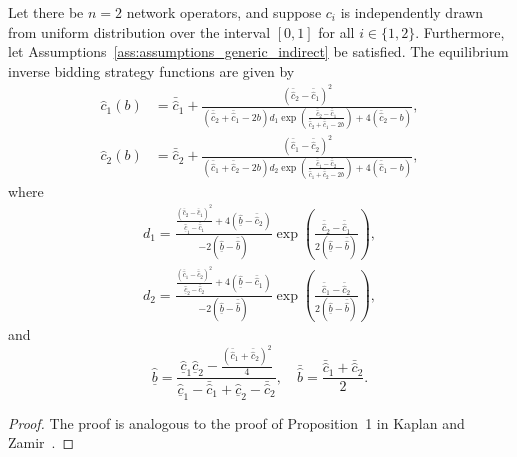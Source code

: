 \begin{propositiona}[\ref{prop:equilibrium_restricted_indirect}]
Let there be $n=2$ network operators, and suppose $c_i$ is independently drawn from uniform distribution over the interval $[0,1]$ for all $i\in \{1, 2\}$. Furthermore, let Assumptions~\ref{ass:assumptions_generic_indirect} be satisfied. The equilibrium inverse bidding strategy functions are given by
\begin{align}
  \hat{c}_1(b) &= \bar{\hat{c}}_1 + \frac{(\bar{\hat{c}}_2 - \bar{\hat{c}}_1)^2}{(\bar{\hat{c}}_2 + \bar{\hat{c}}_1 - 2b)d_1 \exp{\left(\displaystyle\frac{\bar{\hat{c}}_2 - \bar{\hat{c}}_1}{\bar{\hat{c}}_2 + \bar{\hat{c}}_1 - 2b}\right)} + 4(\bar{\hat{c}}_2 - b)},\\[2ex]
  \hat{c}_2(b) &= \bar{\hat{c}}_2 + \frac{(\bar{\hat{c}}_1 - \bar{\hat{c}}_2)^2}{(\bar{\hat{c}}_1 + \bar{\hat{c}}_2 - 2b)d_2 \exp{\left(\displaystyle\frac{\bar{\hat{c}}_1 - \bar{\hat{c}}_2}{\bar{\hat{c}}_1 + \bar{\hat{c}}_2 - 2b}\right)} + 4(\bar{\hat{c}}_1 - b)},
\end{align}
where
\begin{align}
  d_1 = \frac{\displaystyle\frac{(\bar{\hat{c}}_2 - \bar{\hat{c}}_1)^2}{\underline{\hat{c}}_1 - \bar{\hat{c}}_1} + 4(\underline{\hat{b}} - \bar{\hat{c}}_2)}{-2(\underline{\hat{b}} - \bar{\hat{b}})} \exp{\left(\displaystyle\frac{\bar{\hat{c}}_2 - \bar{\hat{c}}_1}{2(\underline{\hat{b}} - \bar{\hat{b}})}\right)}, \\[2ex]
  d_2 = \frac{\displaystyle\frac{(\bar{\hat{c}}_1 - \bar{\hat{c}}_2)^2}{\underline{\hat{c}}_2 - \bar{\hat{c}}_2} + 4(\underline{\hat{b}} - \bar{\hat{c}}_1)}{-2(\underline{\hat{b}} - \bar{\hat{b}})} \exp{\left(\frac{\bar{\hat{c}}_1 - \bar{\hat{c}}_2}{2(\underline{\hat{b}} - \bar{\hat{b}})}\right)},
\end{align}
and
\begin{equation}
  \underline{\hat{b}} = \frac{\underline{\hat{c}}_1\underline{\hat{c}}_2 - \displaystyle\frac{(\bar{\hat{c}}_1 + \bar{\hat{c}}_2)^2}{4}}{\underline{\hat{c}}_1 - \bar{\hat{c}}_1 + \underline{\hat{c}}_2 - \bar{\hat{c}}_2},\quad
  \bar{\hat{b}} = \frac{\bar{\hat{c}}_1 + \bar{\hat{c}}_2}{2}.
\end{equation}
\end{propositiona}
\begin{proof}
The proof is analogous to the proof of Proposition~1 in Kaplan and Zamir~\cite{KaplanZamir2007}.
\end{proof}

